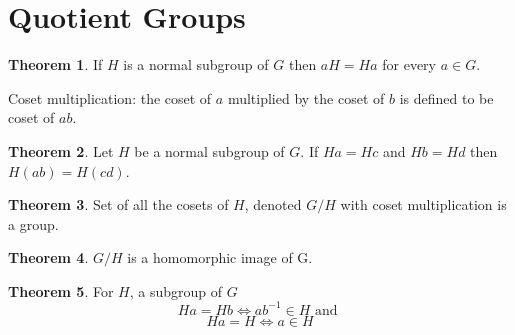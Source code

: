 \documentclass[a4paper,12pt]{article}
\theoremstyle{definition}
\theoremstyle{axiom}
\theoremstyle{theorem}
\newtheorem{theorem}{Theorem}[section]
\theoremstyle{lemma}
\begin{document}
\section{Quotient Groups}
\begin{theorem}{}
    If $H$ is a normal subgroup of $G$ then $aH = Ha$ for every $a \in G$.
\end{theorem}
Coset multiplication: the coset of $a$ multiplied by the coset of $b$ is defined to be coset of $ab$.
\begin{theorem}{}
    Let $H$ be a normal subgroup of $G$. If $Ha = Hc$ and $Hb = Hd$ then $H(ab) = H(cd)$.
\end{theorem}
\begin{theorem}{}
    Set of all the cosets of $H$, denoted $G/H$ with coset multiplication is a group.
\end{theorem}
\begin{theorem}{}
    $G/H$ is a homomorphic image of G.
\end{theorem}
\begin{theorem}{}
        For $H$, a subgroup of $G$
        \begin{equation*}\tag{a}
            Ha = Hb \iff ab^{-1} \in H \text{ and }
        \end{equation*}
        \begin{equation*}\tag{b}
            Ha = H \iff a \in H
        \end{equation*}
\end{theorem}
\end{document}
